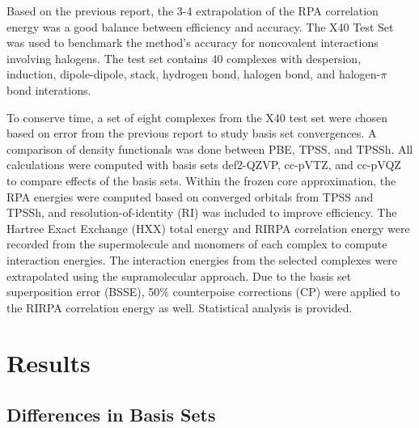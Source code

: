 \documentclass[11pt]{article}
\begin{document}
Based on the previous report, the 3-4 extrapolation of the RPA
correlation energy was a good balance between efficiency and accuracy.
The X40 Test Set was used to benchmark the method's accuracy for 
noncovalent interactions involving halogens. The test set contains 40
complexes with despersion, induction, dipole-dipole, stack, hydrogen
bond, halogen bond, and halogen-$\pi$ bond interations.

To conserve time, a set of eight complexes from the X40 test set were
chosen based on error from the previous report to study basis set
convergences. A comparison of density functionals was done between
PBE, TPSS, and TPSSh.\autocite{Perdew.Burke:GGA-Made-Simple.PRLT.96,
  Tao.Perdew:Nonempirical-Meta-GGA.PRLT.03,doi:10.1063/1.1665298} All calculations
were computed with basis sets def2-QZVP,\autocite{Weigend.Ahlrichs:Balanced-basis-sets.PPCP.05}
cc-pVTZ, and cc-pVQZ\autocite{Dunning:Gaussian-basis-correlated.JCPS.89} to
compare effects of the basis sets. Within the frozen core approximation,
the RPA energies were computed based on converged orbitals from TPSS and TPSSh, and
resolution-of-identity (RI) was included to improve efficiency. The Hartree
Exact Exchange (HXX) total energy and RIRPA correlation energy were
recorded from the supermolecule and monomers of each complex to compute
interaction energies. The interaction energies from the selected complexes
were extrapolated using the supramolecular approach. Due to the basis set
superposition error (BSSE), 50$\%$ counterpoise corrections (CP) were
applied to the RIRPA correlation energy as well. Statistical analysis
is provided.

\section{Results}

\subsection{Differences in Basis Sets}
\end{document}
